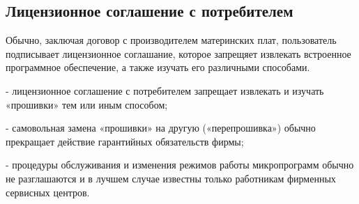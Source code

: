 \subsection{Лицензионное соглашение с потребителем}
Обычно, заключая договор с производителем материнских плат,
	пользователь подписывает лицензионное соглашание,
		которое запрещяет извлекать встроенное программное обеспечение, а также изучать его различными способами.


 - лицензионное соглашение с потребителем запрещает извлекать и изучать «прошивки» тем или иным способом;

 - самовольная замена «прошивки» на другую («перепрошивка») обычно прекращает действие гарантийных обязательств фирмы;

 - процедуры обслуживания и изменения режимов работы микропрограмм обычно не разглашаются и в лучшем случае известны только работникам фирменных сервисных центров.
